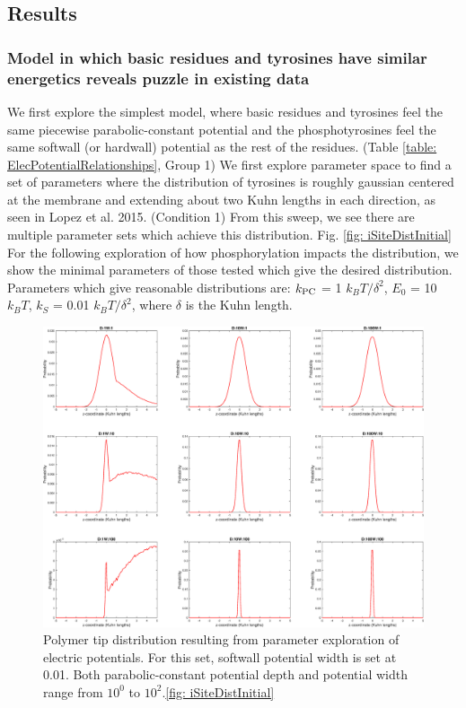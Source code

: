 \documentclass[../../AdvancementSummary.tex]{subfiles}
\begin{document}
\subsection{Results}
\subsubsection{Model in which basic residues and tyrosines have similar energetics reveals puzzle in existing data}

We first explore the simplest model, where basic residues and tyrosines feel the same piecewise parabolic-constant potential and the phosphotyrosines feel the same softwall (or hardwall) potential as the rest of the residues. (Table \ref{table: ElecPotentialRelationships}, Group 1) We first explore parameter space to find a set of parameters where the distribution of tyrosines is roughly gaussian centered at the membrane and extending about two Kuhn lengths in each direction, as seen in Lopez et al. 2015. (Condition 1) From this sweep, we see there are multiple parameter sets which achieve this distribution.  Fig. \ref{fig: iSiteDistInitial} For the following exploration of how phosphorylation impacts the distribution, we show the minimal parameters of those tested which give the desired distribution. Parameters which give reasonable distributions are: $k_{\rm{PC}}$ = 1 $k_BT/\delta^2$, $E_0$ = 10 $k_BT$, $k_S$ = 0.01 $k_BT/\delta^2$, where $\delta$ is the Kuhn length.


\begin{figure}[H]
\begin{center}
\includegraphics[width=0.8\linewidth]{ResultsFigures/CD3ZetaSoftwallPiecewiseBasicsY/DistributioniSite7.eps}
\end{center}
\caption{Polymer tip distribution resulting from parameter exploration of electric potentials. For this set, softwall potential width is set at 0.01. Both parabolic-constant potential depth and potential width range from $10^0$ to $10^{2}$.\ref{fig: iSiteDistInitial}}
\end{figure}
\end{document}
